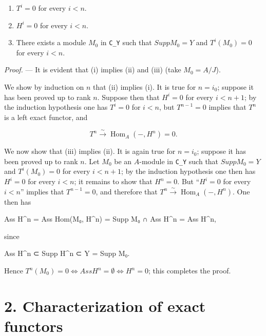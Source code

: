 \documentclass[
  11pt,
  a4paper,
]{book}
\newenvironment{Shaded}{}{}
\newcommand{\NormalTok}[1]{#1}
\providecommand{\tightlist}{%
  \setlength{\itemsep}{0pt}\setlength{\parskip}{0pt}}
\begin{document}
\begin{enumerate}
\def\labelenumi{\arabic{enumi}.}
\tightlist
\item
  \(T^{i} = 0\) for every \(i < n\).
\item
  \(H^{i} = 0\) for every \(i < n\).
\item
  There exists a module \(M_{0}\) in \texttt{C\_Y} such that
  \(Supp M_{0} = Y\) and \(T^{i}(M_{0}) = 0\) for every \(i < n\).
\end{enumerate}

\emph{Proof.} --- It is evident that (i) implies (ii) and (iii) (take
\(M_{0} = A/J\)).

We show by induction on \(n\) that (ii) implies (i). It is true for
\(n = i_{0}\); suppose it has been proved up to rank \(n\). Suppose then
that \(H^{i} = 0\) for every \(i < n + 1\); by the induction hypothesis
one has \(T^{i} = 0\) for \(i < n\), but \(T^{n-1} = 0\) implies that
\(T^{n}\) is a left exact functor, and

\[ T^{n} \xrightarrow{\sim} \operatorname{Hom}_{A}(-, H^{n}) = 0. \]

We now show that (iii) implies (ii). It is again true for \(n = i_{0}\);
suppose it has been proved up to rank \(n\). Let \(M_{0}\) be an
\(A\)-module in \texttt{C\_Y} such that \(Supp M_{0} = Y\) and
\(T^{i}(M_{0}) = 0\) for every \(i < n + 1\); by the induction
hypothesis one then has \(H^{i} = 0\) for every \(i < n\); it remains to
show that \(H^{n} = 0\). But ``\(H^{i} = 0\) for every \(i < n\)''
implies that \(T^{n-1} = 0\), and therefore that
\(T^{n} \xrightarrow{\sim} \operatorname{Hom}_{A}(-,
H^{n})\). One then has

\begin{Shaded}
\begin{Highlighting}[]
\NormalTok{Ass H\^{}n = Ass Hom(M₀, H\^{}n) = Supp M₀ ∩ Ass H\^{}n = Ass H\^{}n,}
\end{Highlighting}
\end{Shaded}

since

\begin{Shaded}
\begin{Highlighting}[]
\NormalTok{Ass H\^{}n ⊂ Supp H\^{}n ⊂ Y = Supp M₀.}
\end{Highlighting}
\end{Shaded}

Hence
\(T^{n}(M_{0}) = 0 \Leftrightarrow Ass H^{n} = \emptyset \Leftrightarrow H^{n} = 0\);
this completes the proof.

\section{2. Characterization of exact
functors}\label{characterization-of-exact-functors}
\end{document}
